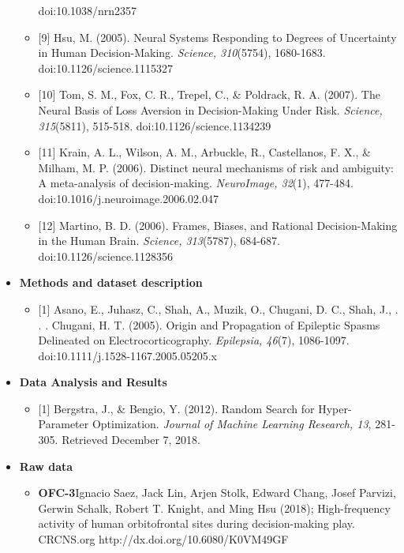 \documentclass[11pt]{article}
\providecommand{\tightlist}{%
      \setlength{\itemsep}{0pt}\setlength{\parskip}{0pt}}
\begin{document}
\begin{itemize}
\begin{itemize}
    doi:10.1038/nrn2357
  \item
    {[}9{]} Hsu, M. (2005). Neural Systems Responding to Degrees of
    Uncertainty in Human Decision-Making. \emph{Science, 310}(5754),
    1680-1683. doi:10.1126/science.1115327
  \item
    {[}10{]} Tom, S. M., Fox, C. R., Trepel, C., \& Poldrack, R. A.
    (2007). The Neural Basis of Loss Aversion in Decision-Making Under
    Risk. \emph{Science, 315}(5811), 515-518.
    doi:10.1126/science.1134239
  \item
    {[}11{]} Krain, A. L., Wilson, A. M., Arbuckle, R., Castellanos, F.
    X., \& Milham, M. P. (2006). Distinct neural mechanisms of risk and
    ambiguity: A meta-analysis of decision-making. \emph{NeuroImage,
    32}(1), 477-484. doi:10.1016/j.neuroimage.2006.02.047
  \item
    {[}12{]} Martino, B. D. (2006). Frames, Biases, and Rational
    Decision-Making in the Human Brain. \emph{Science, 313}(5787),
    684-687. doi:10.1126/science.1128356
  \end{itemize}
\item
  \textbf{Methods and dataset description}

  \begin{itemize}
  \tightlist
  \item
    {[}1{]} Asano, E., Juhasz, C., Shah, A., Muzik, O., Chugani, D. C.,
    Shah, J., . . . Chugani, H. T. (2005). Origin and Propagation of
    Epileptic Spasms Delineated on Electrocorticography.
    \emph{Epilepsia, 46}(7), 1086-1097.
    doi:10.1111/j.1528-1167.2005.05205.x
  \end{itemize}
\item
  \textbf{Data Analysis and Results}

  \begin{itemize}
  \tightlist
  \item
    {[}1{]} Bergstra, J., \& Bengio, Y. (2012). Random Search for
    Hyper-Parameter Optimization. \emph{Journal of Machine Learning
    Research, 13}, 281-305. Retrieved December 7, 2018.
  \end{itemize}
\item
  \textbf{Raw data}

  \begin{itemize}
  \tightlist
  \item
    \textbf{OFC-3}Ignacio Saez, Jack Lin, Arjen Stolk, Edward Chang,
    Josef Parvizi, Gerwin Schalk, Robert T. Knight, and Ming Hsu (2018);
    High-frequency activity of human orbitofrontal sites during
    decision-making play. CRCNS.org http://dx.doi.org/10.6080/K0VM49GF
  \end{itemize}
\end{itemize}
\end{document}
